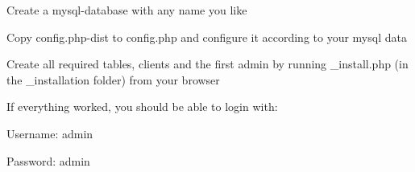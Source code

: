
\begin{DoxyEnumerate}
\item \-Create a mysql-\/database with any name you like
\item \-Copy config.\-php-\/dist to config.\-php and configure it according to your mysql data
\item \-Create all required tables, clients and the first admin by running \-\_\-install.\-php (in the \-\_\-installation folder) from your browser
\item \-If everything worked, you should be able to login with\-:
\begin{DoxyItemize}
\item \-Username\-: admin
\item \-Password\-: admin
\end{DoxyItemize}
\end{DoxyEnumerate}